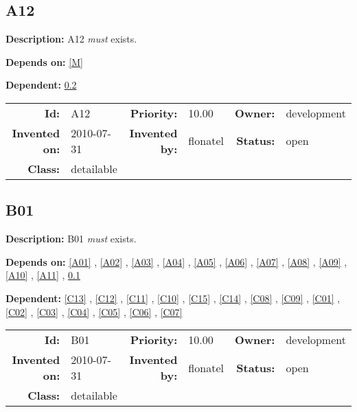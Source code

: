 \subsection{A12}\label{A12}
\textbf{Description:} A12 \textsl{must} exists.

\textbf{Depends on:} \ref{M} 

\textbf{Dependent:} \ref{B01} 

\par
{\small \begin{center}\begin{tabular}{rlrlrl}
\textbf{Id:} & A12  & \textbf{Priority:} & 10.00  & \textbf{Owner:} & development\\ 
\textbf{Invented on:} & 2010-07-31  & \textbf{Invented by:} & flonatel  & \textbf{Status:} & open \\ 
\textbf{Class:} & detailable  & & & \end{tabular}\end{center} }
\subsection{B01}\label{B01}
\textbf{Description:} B01 \textsl{must} exists.

\textbf{Depends on:} \ref{A01} , \ref{A02} , \ref{A03} , \ref{A04} , \ref{A05} , \ref{A06} , \ref{A07} , \ref{A08} , \ref{A09} , \ref{A10} , \ref{A11} , \ref{A12} 

\textbf{Dependent:} \ref{C13} , \ref{C12} , \ref{C11} , \ref{C10} , \ref{C15} , \ref{C14} , \ref{C08} , \ref{C09} , \ref{C01} , \ref{C02} , \ref{C03} , \ref{C04} , \ref{C05} , \ref{C06} , \ref{C07} 

\par
{\small \begin{center}\begin{tabular}{rlrlrl}
\textbf{Id:} & B01  & \textbf{Priority:} & 10.00  & \textbf{Owner:} & development\\ 
\textbf{Invented on:} & 2010-07-31  & \textbf{Invented by:} & flonatel  & \textbf{Status:} & open \\ 
\textbf{Class:} & detailable  & & & \end{tabular}\end{center} }
